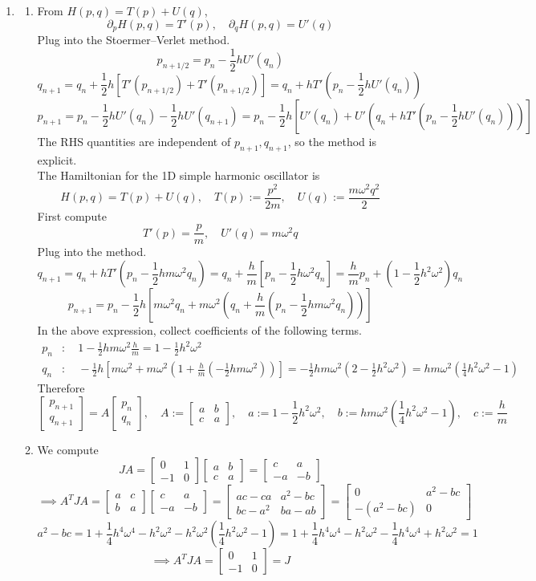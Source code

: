 \documentclass{article}
\newcommand{\br}[1]{\left(#1\right)}
\newcommand{\sbr}[1]{\left[#1\right]}
\newcommand{\m}[2][b]{\begin{#1matrix}#2\end{#1matrix}}
\newcommand{\imp}{\implies}
\newcommand{\ptl}{\partial}
\newcommand{\om}{\omega}
\begin{document}
\begin{enumerate}
\item

\begin{enumerate}
		
	\item From $H(p,q)=T(p)+U(q)$,
	$$\ptl_pH(p,q) = T'(p),
	\quad \ptl_qH(p,q) = U'(q)$$
	Plug into the Stoermer--Verlet method.
	$$p_{n+1/2} = p_n - \frac12hU'(q_n)$$
	$$q_{n+1} = q_n + \frac12h[T'(p_{n+1/2}) + T'(p_{n+1/2})]
	= q_n + hT'\br{p_n - \frac12hU'(q_n)}$$
	$$p_{n+1} = p_n - \frac12hU'(q_n) - \frac12hU'(q_{n+1})
	= p_n - \frac12h\sbr{U'(q_n) + U'\br{q_n + hT'\br{p_n - \frac12hU'(q_n)}}}$$
	The RHS quantities are independent of $p_{n+1},q_{n+1}$, so the method is explicit.\\
	
	The Hamiltonian for the 1D simple harmonic oscillator is
	$$H(p,q) = T(p) + U(q),
	\quad T(p) := \frac{p^2}{2m},
	\quad U(q) := \frac{m\om^2q^2}{2}$$
	First compute
	$$T'(p) = \frac pm,
	\quad U'(q) = m\om^2q$$
	Plug into the method.
	$$q_{n+1} = q_n + hT'\br{p_n - \frac12hm\om^2q_n}
	= q_n + \frac hm\sbr{p_n - \frac12h\om^2q_n}
	= \frac hmp_n + \br{1 - \frac12h^2\om^2}q_n$$
	$$p_{n+1} = p_n - \frac12h\sbr{m\om^2q_n + m\om^2\br{q_n + \frac hm\br{p_n - \frac12hm\om^2q_n}}}$$
	In the above expression, collect coefficients of the following terms.
	\begin{align*}
		p_n &: \quad 1 - \frac12hm\om^2\frac hm = 1 - \frac12h^2\om^2 \\
		q_n &: \quad -\frac12h\sbr{m\om^2 + m\om^2\br{1+ \frac hm\br{-\frac12hm\om^2}}}
		= -\frac12hm\om^2\br{2 - \frac12h^2\om^2}
		= hm\om^2\br{\frac14h^2\om^2 - 1}
	\end{align*}
	Therefore
	$$\m{p_{n+1} \\ q_{n+1}} = A\m{p_n \\ q_n},
	\quad A := \m{a & b \\ c & a},
	\quad a := 1 - \frac12h^2\om^2,
	\quad b := hm\om^2\br{\frac14h^2\om^2 - 1},
	\quad c := \frac hm$$
	
	
	\item We compute
	$$JA = \m{0 & 1 \\ -1 & 0}\m{a & b \\ c & a}
	= \m{c & a \\ -a & -b}$$
	$$\imp A^TJA = \m{a & c \\ b & a}\m{c & a \\ -a & -b}
	= \m{ac-ca & a^2-bc \\ bc-a^2 & ba-ab}
	= \m{0 & a^2-bc \\ -(a^2-bc) & 0}$$
	$$a^2 - bc = 1 + \frac14h^4\om^4 - h^2\om^2 - h^2\om^2\br{\frac14h^2\om^2 - 1}
	= 1 + \frac14h^4\om^4 - h^2\om^2 - \frac14h^4\om^4 + h^2\om^2
	= 1$$
	$$\imp A^TJA = \m{0 & 1 \\ -1 & 0} = J$$
	

\end{enumerate}
\end{enumerate}
\end{document}
